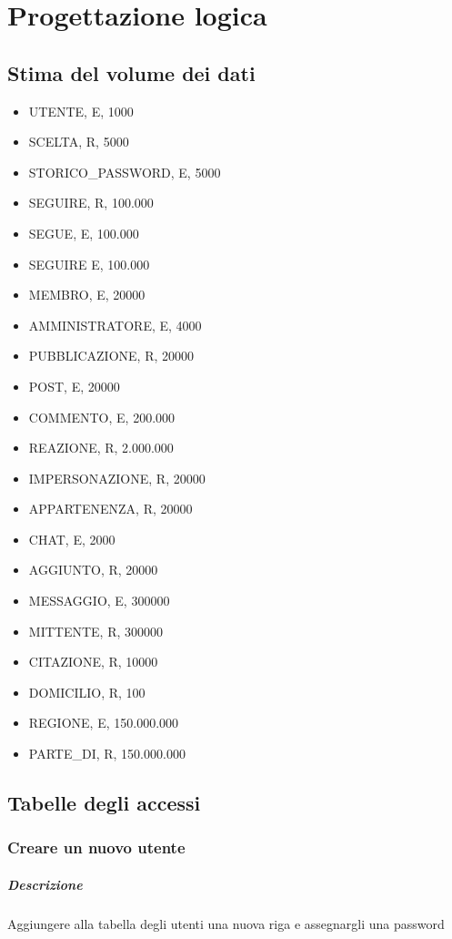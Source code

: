 \documentclass[a4paper,12pt]{report}
\begin{document}
\chapter{Progettazione logica}
\section{Stima del volume dei dati}

\begin{itemize}
  \item UTENTE, E, 1000
  \item SCELTA, R, 5000
  \item STORICO\_PASSWORD, E, 5000
  \item SEGUIRE, R, 100.000
  \item SEGUE, E, 100.000
  \item SEGUIRE E, 100.000
  \item MEMBRO, E, 20000
  \item AMMINISTRATORE, E, 4000
  \item PUBBLICAZIONE, R, 20000
  \item POST, E, 20000
  \item COMMENTO, E, 200.000
  \item REAZIONE, R, 2.000.000
  \item IMPERSONAZIONE, R, 20000
  \item APPARTENENZA, R, 20000
  \item CHAT, E, 2000 
  \item AGGIUNTO, R, 20000 
  \item MESSAGGIO, E, 300000
  \item MITTENTE, R, 300000
  \item CITAZIONE, R, 10000
  \item DOMICILIO, R, 100
  \item REGIONE, E, 150.000.000
  \item PARTE\_DI, R, 150.000.000

\end{itemize}

\section{Tabelle degli accessi}

\subsection{Creare un nuovo utente} \label{nuovo_utente}
\paragraph{Descrizione} Aggiungere alla tabella degli utenti una nuova riga e assegnargli una password 
\end{document}
